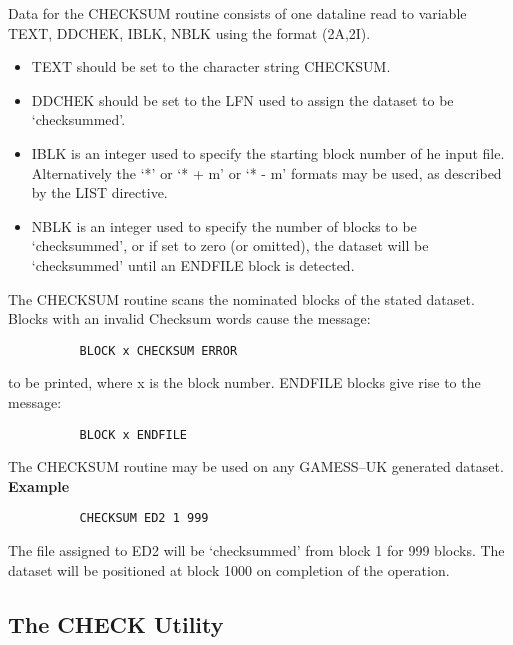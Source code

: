 \documentclass[11pt,fleqn]{article}
\begin{document}
Data for the CHECKSUM routine consists of one dataline read to variable
TEXT, DDCHEK, IBLK, NBLK using the format (2A,2I).
\begin{itemize}
\item TEXT should be set to the character string CHECKSUM.
\item DDCHEK should be set to the LFN used to assign the dataset
to be `checksummed'.
\item IBLK is an integer used to specify the starting block number of
he input file. Alternatively the `*' or `* + m' or `* - m'
formats may be used, as described by the LIST directive.
\item NBLK is an integer used to specify the number of blocks to be
`checksummed', or if set to zero (or omitted), the dataset
will be `checksummed' until an ENDFILE block is detected.
\end{itemize}
 The CHECKSUM routine scans the nominated blocks of the stated dataset.
Blocks with an invalid Checksum words cause the message:

{
\footnotesize
\begin{verbatim}
          BLOCK x CHECKSUM ERROR
\end{verbatim}
}
to be printed, where x is the block number. ENDFILE blocks give rise to
the message:
{
\footnotesize
\begin{verbatim}
          BLOCK x ENDFILE
\end{verbatim}
}
The CHECKSUM routine may be used on any GAMESS--UK generated dataset.\\

{\bf Example}
{
\footnotesize
\begin{verbatim}
          CHECKSUM ED2 1 999
\end{verbatim}
}
The file assigned to ED2 will be `checksummed' from block 1 for
999 blocks. The dataset will be positioned at block 1000 on completion
of the operation.

\subsection{The CHECK Utility}
\end{document}
